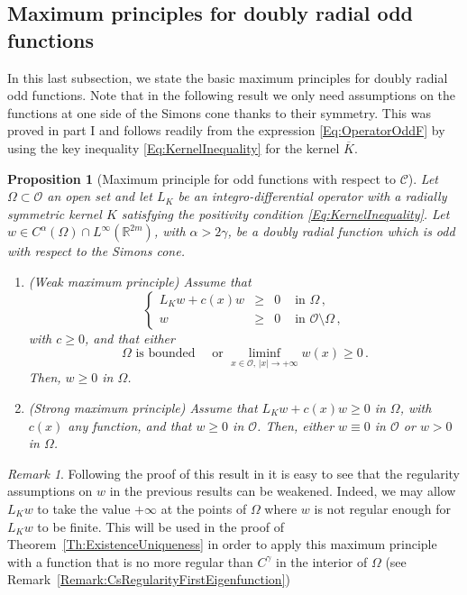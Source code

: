 \documentclass[12pt,reqno]{amsart}
\newtheorem{proposition}[theorem]{Proposition}
\theoremstyle{definition}
\theoremstyle{remark}
\newtheorem{remark}[theorem]{Remark}
\newcommand{\con}[1]{\mathbb{#1}}
\newcommand{\R}{\con{R}} %
\newcommand{\ccal}{\mathscr{C}}
\newcommand{\ocal}{\mathcal{O}}
\newcommand{\s}{\gamma}
\newcommand\beqc[1]{\left\{\begin{array}{#1}}
\newcommand\eeqc{\end{array} \right.}
\def\PDEsystem{rcll}
\numberwithin{equation}{section}
\begin{document}
\subsection{Maximum principles for doubly radial odd functions}
\label{Subsec:MaxPrinciples}

In this last subsection, we state the basic maximum principles for doubly radial odd functions. Note that in the following result we only need assumptions on the functions at one side of the Simons cone thanks to their symmetry. This was proved in part I \cite{FelipeSanz-Perela:IntegroDifferentialI} and follows readily from the expression \eqref{Eq:OperatorOddF} by using the key inequality \eqref{Eq:KernelInequality} for the kernel $\overline{K}$.


\begin{proposition}[Maximum principle for odd functions with respect to $\ccal$]
	\label{Prop:MaximumPrincipleForOddFunctions} Let $\Omega \subset \ocal$ an open set and let $L_K$ be an integro-differential operator with a radially symmetric kernel $K$ satisfying the positivity condition \eqref{Eq:KernelInequality}.  Let $w\in C^{\alpha}(\Omega)\cap L^\infty(\R^{2m})$, with $\alpha > 2\s$, be a doubly radial function which is odd with respect to the Simons cone. 
	
	\begin{enumerate}[label=(\roman{*})]
		\item  (Weak maximum principle)
		Assume that
		$$
		\beqc{\PDEsystem}
		L_K w + c(x) w & \geq & 0 & \text{ in } \Omega\,,\\
		w & \geq & 0 & \text{ in } \ocal \setminus \Omega\,,
		\eeqc
		$$
		with $c \geq 0$, and that either
		$$
		\Omega \text{ is bounded} \quad \text{ or } \liminf_{x \in \ocal,\,|x|\to +\infty} w(x) \geq 0\,.
		$$
		Then, $w \geq 0$ in $\Omega$.
		
		\item (Strong maximum principle)  
		Assume that $L_K w + c(x) w\geq 0$ in $\Omega$, with $c(x)$ any function, and that $w\geq 0$ in $\ocal$. Then, either $w\equiv 0$ in $\ocal$ or $w > 0$ in $\Omega$.
	\end{enumerate} 
\end{proposition}

\begin{remark}
	\label{Remark:MaxPrincipleSingularity}
	Following the proof of this result in \cite{FelipeSanz-Perela:IntegroDifferentialI} it is easy to see that the regularity assumptions on $w$ in the previous results can be weakened. Indeed, we may allow $L_K w$ to take the value $+\infty$ at the points of $\Omega$ where $w$ is not regular enough for $L_K w$ to be finite. This will be used in the proof of Theorem~\ref{Th:ExistenceUniqueness} in order to apply this maximum principle with a function that is no more regular than $C^\s$ in the interior of $\Omega$ (see Remark~\ref{Remark:CsRegularityFirstEigenfunction})
\end{remark}
\end{document}
